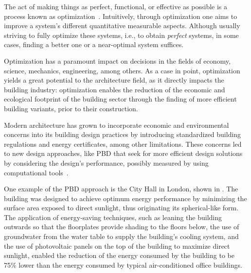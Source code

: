 \cleardoublepage
\label{chap:intro}
	
	The act of making things as perfect, functional, or effective as possible is a process known as optimization~\cite{MerriamWebster2017OptimizationDefinition}. Intuitively, through optimization one aims to improve a system's different quantitative measurable aspects. Although usually striving to fully optimize these systems, i.e., to obtain \textit{perfect} systems, in some cases, finding a better one or a near-optimal system suffices.
	
	Optimization has a paramount impact on decisions in the fields of economy, science, mechanics, engineering, among others. As a case in point, optimization yields a great potential to the architecture field, as it directly impacts the building industry: optimization enables the reduction of the economic and ecological footprint of the building sector through the finding of more efficient building variants, prior to their construction. 
	
	Modern architecture has grown to incorporate economic and environmental concerns into its building design practices by introducing standardized building regulations and energy certificates, among other limitations. These concerns led to new design approaches, like \ac{PBD} that seek for more efficient design solutions by considering the design's performance, possibly measured by using computational tools~\cite{Oxman2006PBD}.
	
	One example of the \ac{PBD} approach is the City Hall in London, shown in . The building was designed to achieve optimum energy performance by minimizing the surface area exposed to direct sunlight, thus originating its spherical-like form. The application of energy-saving techniques, such as leaning the building outwards so that the floorplates provide shading to the floors below, the use of groundwater from the water table to supply the building's cooling system, and the use of photovoltaic panels on the top of the building to maximize direct sunlight, enabled the reduction of the energy consumed by the building to be 75\% lower than the energy consumed by typical air-conditioned office buildings.
	
